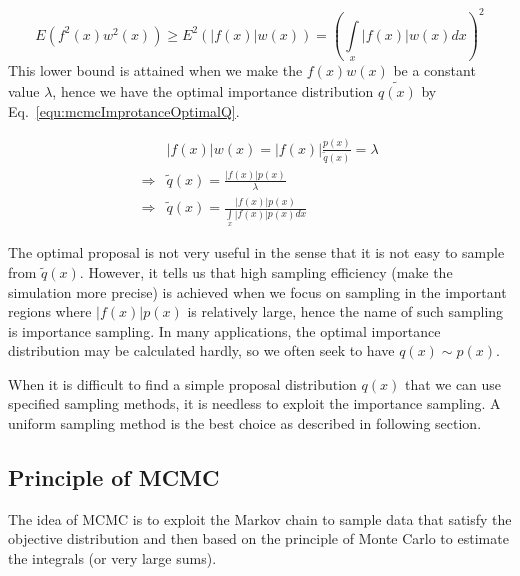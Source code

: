 \documentclass[runningheads,openany]{xhlPaper}
\begin{document}
\begin{equation}
\label{equ:mcmcImportanceLowerBound}
E\left( {{f^2}\left( x \right){w^2}\left( x \right)} \right) \ge {E^2}\left( {|f\left( x \right)|w\left( x \right)} \right) = {\left( {\int\limits_x {|f\left( x \right)|w\left( x \right)dx} } \right)^2}
\end{equation}
This lower bound is attained when we make the $f\left(x\right)w\left(x\right)$ be  a constant value $\lambda$, hence we have the optimal importance distribution $\tilde{q\left(x\right)}$ by Eq.~\ref{equ:mcmcImprotanceOptimalQ}.

\begin{equation}
\label{equ:mcmcImprotanceOptimalQ}
\begin{aligned}
&|f\left( x \right)|w\left( x \right) = |f\left( x \right)|\frac{{p\left( x \right)}}{{\tilde q\left( x \right)}} = \lambda \\
 \Rightarrow& \tilde q\left( x \right) = \frac{{|f\left( x \right)|p\left( x \right)}}{\lambda }\\
 \Rightarrow& \tilde q\left( x \right) = \frac{{|f\left( x \right)|p\left( x \right)}}{{\int\limits_x {|f\left( x \right)|p\left( x \right)dx} }}
\end{aligned}
\end{equation}

The optimal proposal is not very useful in the sense that it is not easy to sample from $\tilde{q}\left(x\right)$. However, it tells us that high sampling efficiency (make the simulation more precise) is achieved when we focus on sampling in the important regions where ${|f\left( x \right)|p\left( x \right)}$ is relatively large, hence the name of such sampling is importance sampling.
In many applications, the optimal importance distribution may be calculated hardly, so we often seek to have $q\left(x\right) \sim p\left(x\right)$.

When it is difficult to find a simple proposal distribution $q\left(x\right)$ that we can use specified sampling methods, it is needless to exploit the importance sampling. A uniform sampling method is the best choice as described in following section.

\subsection{Principle of MCMC}
The idea of MCMC is to exploit the Markov chain to sample data that satisfy the objective distribution and then based on the principle of Monte Carlo to estimate the integrals (or very large sums).
\end{document}
